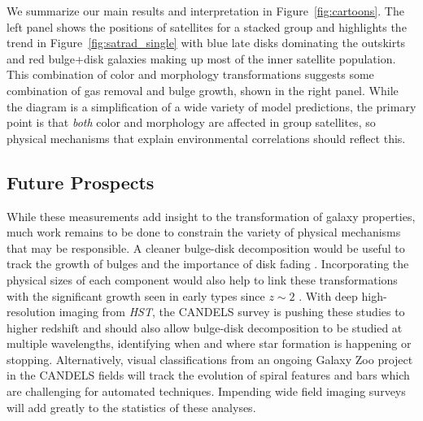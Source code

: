\documentclass[12pt]{emulateapj}
\begin{document}
We summarize our main results and interpretation in
  Figure~\ref{fig:cartoons}. The left panel shows the positions of
  satellites for a stacked group and highlights the trend in
  Figure~\ref{fig:satrad_single} with blue late disks dominating the
  outskirts and red bulge+disk galaxies making up most of the inner
  satellite population. This combination of color and morphology
  transformations suggests some combination of gas removal and bulge
  growth, shown in the right panel. While the diagram is a
  simplification of a wide variety of model predictions, the primary
  point is that \textit{both} color and morphology are affected in
  group satellites, so physical mechanisms that explain environmental
  correlations should reflect this.




\subsection{Future Prospects}

While these measurements add insight to the transformation of galaxy
properties, much work remains to be done to constrain the variety of
physical mechanisms that may be responsible. A cleaner bulge-disk
decomposition would be useful to track the growth of bulges and the
importance of disk fading \citep[e.g.,][]{Lackner2012,
  Lackner2013}. Incorporating the physical sizes of each component
would also help to link these transformations with the significant
growth seen in early types since $z\sim2$
\citep[e.g.,][]{Bruce2012}. With deep high-resolution imaging from
\textit{HST}, the CANDELS survey \citep{Grogin2011,Koekemoer2011} is pushing these
studies to higher redshift and should also allow bulge-disk
decomposition to be studied at multiple wavelengths, identifying when
and where star formation is happening or stopping. Alternatively,
visual classifications from an ongoing Galaxy Zoo project in the
CANDELS fields will track the evolution of spiral features and bars
which are challenging for automated techniques. Impending wide field
imaging surveys will add greatly to the statistics of these analyses.
\end{document}
